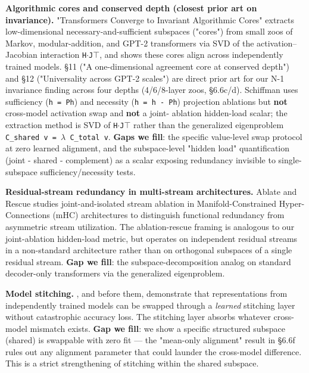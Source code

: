 \textbf{Algorithmic cores and conserved depth (closest prior art on invariance).} \citet{schiffman2026cores} "Transformers Converge to Invariant
Algorithmic Cores" \citep{schiffman2026cores} extracts low-dimensional
necessary-and-sufficient subspaces ("cores") from small zoos of
Markov, modular-addition, and GPT-2 transformers via SVD of the
activation--Jacobian interaction \texttt{H$\cdot$J$\top$}, and shows these cores align
across independently trained models. \S{}11 ("A one-dimensional
agreement core at conserved depth") and \S{}12 ("Universality across
GPT-2 scales") are direct prior art for our N-1 invariance finding
across four depths (4/6/8-layer zoos, \S{}6.6c/d). Schiffman uses
sufficiency (\texttt{h = Ph}) and necessity (\texttt{h = h - Ph}) projection
ablations but \textbf{not} cross-model activation swap and \textbf{not} a joint-
ablation hidden-load scalar; the extraction method is SVD of \texttt{H$\cdot$J$\top$}
rather than the generalized eigenproblem \texttt{C\_shared v = $\lambda$ C\_total v}.
\textbf{Gaps we fill}: the specific value-level swap protocol at zero
learned alignment, and the subspace-level "hidden load" quantification
(joint - shared - complement) as a scalar exposing redundancy
invisible to single-subspace sufficiency/necessity tests.

\textbf{Residual-stream redundancy in multi-stream architectures.} Ablate
and Rescue \citep{ablaterescue2026} studies joint-and-isolated stream
ablation in Manifold-Constrained Hyper-Connections (mHC)
architectures to distinguish functional redundancy from asymmetric
stream utilization. The ablation-rescue framing is analogous to our
joint-ablation hidden-load metric, but operates on independent
residual streams in a non-standard architecture rather than on
orthogonal subspaces of a single residual stream. \textbf{Gap we fill}:
the subspace-decomposition analog on standard decoder-only
transformers via the generalized eigenproblem.

\textbf{Model stitching.} \citet{bansal2021stitching}, and \citet{lenc2015understanding} before them, demonstrate that representations from independently
trained models can be swapped through a \emph{learned} stitching layer
without catastrophic accuracy loss. The stitching layer absorbs
whatever cross-model mismatch exists. \textbf{Gap we fill}: we show a
specific structured subspace (shared) is swappable with zero fit ---
the "mean-only alignment" result in \S{}6.6f rules out any alignment
parameter that could launder the cross-model difference. This is a
strict strengthening of stitching within the shared subspace.

